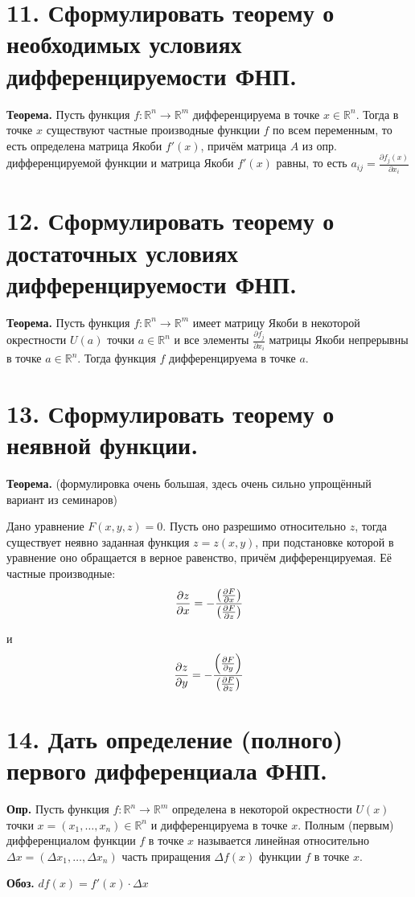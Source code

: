 \documentclass[11pt]{article}
\begin{document}
\section*{11. Сформулировать теорему о необходимых условиях дифференцируемости ФНП.}
\par\textbf{Теорема.} Пусть функция $f: \mathbb{R}^{n} \to \mathbb{R}^{m}$ дифференцируема в точке $x \in \mathbb{R}^{n}$. Тогда в точке $x$ существуют частные производные функции $f$ по всем переменным, то есть определена матрица Якоби $f'(x)$, причём матрица $A$ из опр. дифференцируемой функции и матрица Якоби $f'(x)$ равны, то есть $a_{{ij}} = \frac{\partial f_{j}(x)}{\partial x_{i}}$
\section*{12. Сформулировать теорему о достаточных условиях дифференцируемости ФНП.}
\par\textbf{Теорема.} Пусть функция $f: \mathbb{R}^{n} \to \mathbb{R}^{m}$ имеет матрицу Якоби в некоторой окрестности $U(a)$ точки $a \in \mathbb{R}^{n}$ и все элементы $\frac{\partial f_{j}}{\partial x_{i}}$ матрицы Якоби непрерывны в точке $a \in \mathbb{R}^{n}$. Тогда функция $f$ дифференцируема в точке $a$.
\section*{13. Сформулировать теорему о неявной функции.}
\par\textbf{Теорема.} (формулировка очень большая, здесь очень сильно упрощённый вариант из семинаров)
\par Дано уравнение $F(x, y, z) = 0$. Пусть оно разрешимо относительно $z$, тогда существует неявно заданная функция $z = z(x, y)$, при подстановке которой в уравнение оно обращается в верное равенство, причём дифференцируемая. Её частные производные:
$$\Large \frac{\partial z}{\partial x} = -\frac{\left(\frac{\partial F}{\partial x}\right)}{\left(\frac{\partial F}{\partial z}\right)}$$
\par и
$$\Large \frac{\partial z}{\partial y} = -\frac{\left(\frac{\partial F}{\partial y}\right)}{\left(\frac{\partial F}{\partial z}\right)}$$
\section*{14. Дать определение (полного) первого дифференциала ФНП.}
\par\textbf{Опр.} Пусть функция $f: \mathbb{R}^{n} \to \mathbb{R}^{m}$ определена в некоторой окрестности $U(x)$ точки $x = (x_{1}, \dots, x_{n}) \in \mathbb{R}^{n}$ и дифференцируема в точке $x$. Полным (первым) дифференциалом функции $f$ в точке $x$ называется линейная относительно $\Delta x = (\Delta x_{1}, \dots, \Delta x_{n})$ часть приращения $\Delta f(x)$ функции $f$ в точке $x$.
\par\textbf{Обоз.} $df(x) = f'(x) \cdot \Delta x$
\end{document}
